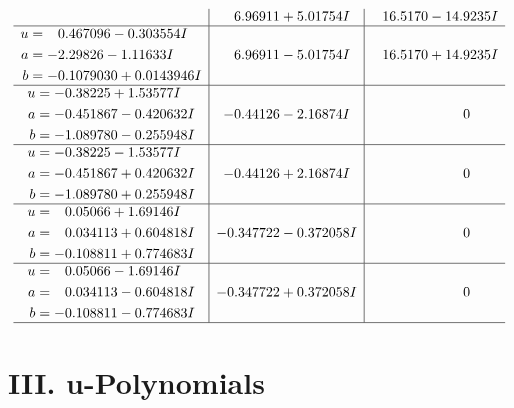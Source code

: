 \documentclass[1p]{elsarticle_modified}
\theoremstyle{definition}
\begin{document}
$$\begin{array}{c|c|c}
 & \phantom{-}6.96911 + 5.01754 I & \phantom{-}16.5170 - 14.9235 I \\ \hline\begin{aligned}
u &= \phantom{-}0.467096 - 0.303554 I \\
a &= -2.29826 - 1.11633 I \\
b &= -0.1079030 + 0.0143946 I\end{aligned}
 & \phantom{-}6.96911 - 5.01754 I & \phantom{-}16.5170 + 14.9235 I \\ \hline\begin{aligned}
u &= -0.38225 + 1.53577 I \\
a &= -0.451867 - 0.420632 I \\
b &= -1.089780 - 0.255948 I\end{aligned}
 & -0.44126 - 2.16874 I & \phantom{-0.000000 } 0 \\ \hline\begin{aligned}
u &= -0.38225 - 1.53577 I \\
a &= -0.451867 + 0.420632 I \\
b &= -1.089780 + 0.255948 I\end{aligned}
 & -0.44126 + 2.16874 I & \phantom{-0.000000 } 0 \\ \hline\begin{aligned}
u &= \phantom{-}0.05066 + 1.69146 I \\
a &= \phantom{-}0.034113 + 0.604818 I \\
b &= -0.108811 + 0.774683 I\end{aligned}
 & -0.347722 - 0.372058 I & \phantom{-0.000000 } 0 \\ \hline\begin{aligned}
u &= \phantom{-}0.05066 - 1.69146 I \\
a &= \phantom{-}0.034113 - 0.604818 I \\
b &= -0.108811 - 0.774683 I\end{aligned}
 & -0.347722 + 0.372058 I & \phantom{-0.000000 } 0\\
 \hline 
 \end{array}$$\newpage
\newpage\renewcommand{\arraystretch}{1}
\centering \section*{ III. u-Polynomials}
\end{document}
